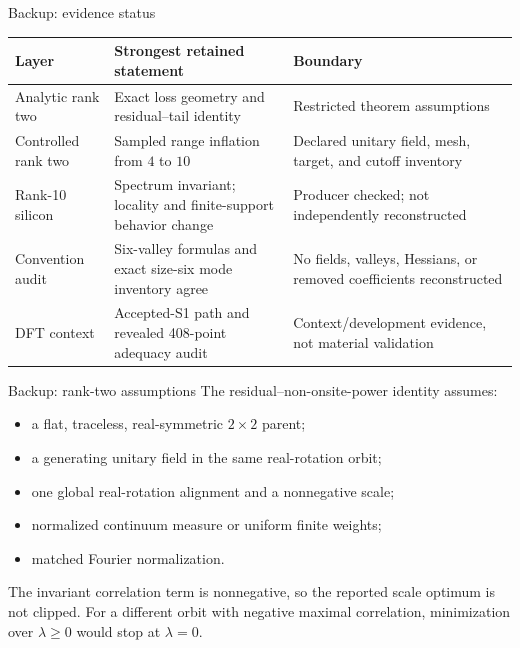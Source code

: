 \documentclass[aspectratio=169,10pt]{beamer}
\begin{document}
\appendix

\begin{frame}{Backup: evidence status}
  \scriptsize
  \begin{tabular}{@{}p{}p{}p{}@{}}
    \toprule
    Layer & Strongest retained statement & Boundary \\
    \midrule
    Analytic rank two & Exact loss geometry and residual--tail identity & Restricted theorem assumptions \\
    Controlled rank two & Sampled range inflation from $4$ to $10$ & Declared unitary field, mesh, target, and cutoff inventory \\
    Rank-10 silicon & Spectrum invariant; locality and finite-support behavior change & Producer checked; not independently reconstructed \\
    Convention audit & Six-valley formulas and exact size-six mode inventory agree & No fields, valleys, Hessians, or removed coefficients reconstructed \\
    DFT context & Accepted-S1 path and revealed 408-point adequacy audit & Context/development evidence, not material validation \\
    \bottomrule
  \end{tabular}
\end{frame}

\begin{frame}{Backup: rank-two assumptions}
  \small
  The residual--non-onsite-power identity assumes:
  \begin{itemize}
    \item a flat, traceless, real-symmetric $2\times2$ parent;
    \item a generating unitary field in the same real-rotation orbit;
    \item one global real-rotation alignment and a nonnegative scale;
    \item normalized continuum measure or uniform finite weights;
    \item matched Fourier normalization.
  \end{itemize}
  The invariant correlation term is nonnegative, so the reported scale optimum is not
  clipped. For a different orbit with negative maximal correlation, minimization over
  $\lambda\ge0$ would stop at $\lambda=0$.
\end{frame}
\end{document}
